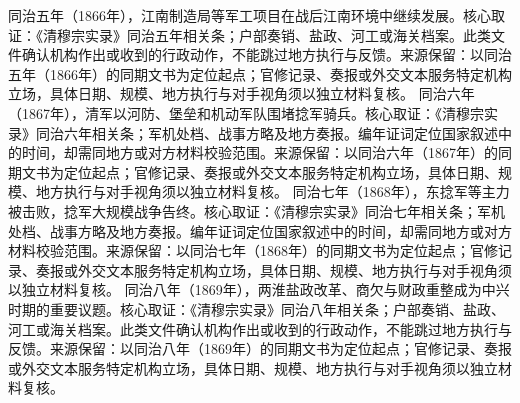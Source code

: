 同治五年（1866年），江南制造局等军工项目在战后江南环境中继续发展。核心取证：《清穆宗实录》同治五年相关条；户部奏销、盐政、河工或海关档案。此类文件确认机构作出或收到的行政动作，不能跳过地方执行与反馈。来源保留：以同治五年（1866年）的同期文书为定位起点；官修记录、奏报或外交文本服务特定机构立场，具体日期、规模、地方执行与对手视角须以独立材料复核。
同治六年（1867年），清军以河防、堡垒和机动军队围堵捻军骑兵。核心取证：《清穆宗实录》同治六年相关条；军机处档、战事方略及地方奏报。编年证词定位国家叙述中的时间，却需同地方或对方材料校验范围。来源保留：以同治六年（1867年）的同期文书为定位起点；官修记录、奏报或外交文本服务特定机构立场，具体日期、规模、地方执行与对手视角须以独立材料复核。
同治七年（1868年），东捻军等主力被击败，捻军大规模战争告终。核心取证：《清穆宗实录》同治七年相关条；军机处档、战事方略及地方奏报。编年证词定位国家叙述中的时间，却需同地方或对方材料校验范围。来源保留：以同治七年（1868年）的同期文书为定位起点；官修记录、奏报或外交文本服务特定机构立场，具体日期、规模、地方执行与对手视角须以独立材料复核。
同治八年（1869年），两淮盐政改革、商欠与财政重整成为中兴时期的重要议题。核心取证：《清穆宗实录》同治八年相关条；户部奏销、盐政、河工或海关档案。此类文件确认机构作出或收到的行政动作，不能跳过地方执行与反馈。来源保留：以同治八年（1869年）的同期文书为定位起点；官修记录、奏报或外交文本服务特定机构立场，具体日期、规模、地方执行与对手视角须以独立材料复核。
